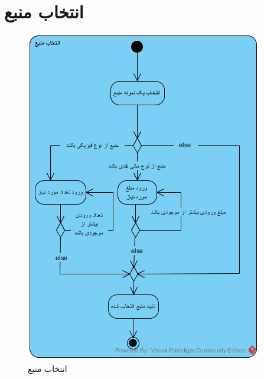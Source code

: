 \section{انتخاب منبع}
\begin{figure}[H]
	\centering
	\includegraphics[scale=0.8]{img/activity/chooseres}
	\caption{انتخاب منبع}
\end{figure}


